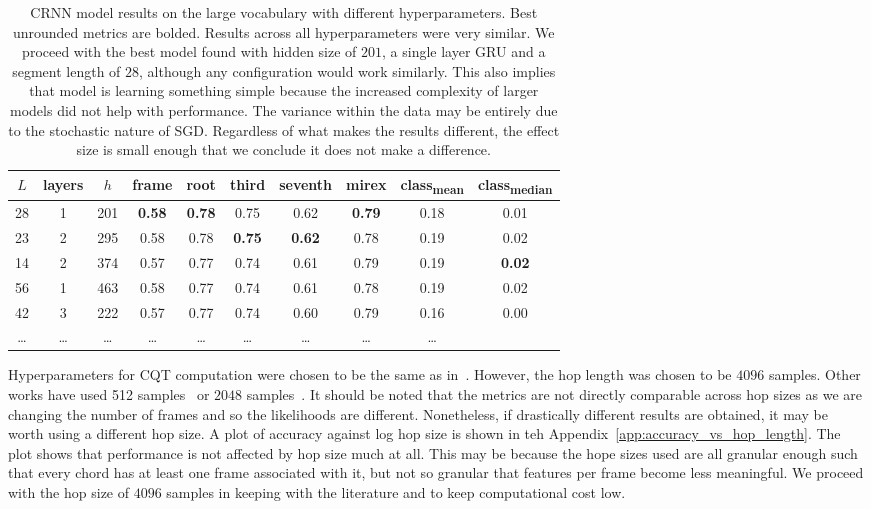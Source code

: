 \begin{table}[H]
    \centering
    \begin{tabular}{cccccccccc}
        \toprule
        $L$ & layers & $h$ & frame & root & third & seventh & mirex & class\textsubscript{mean} & class\textsubscript{median} \\
        \midrule
        28 & 1 & 201 & \textbf{0.58} & \textbf{0.78} & 0.75 & 0.62 & \textbf{0.79} & 0.18 & 0.01 \\
        23 & 2 & 295 & 0.58 & 0.78 & \textbf{0.75} & \textbf{0.62} & 0.78 & 0.19 & 0.02 \\
        14 & 2 & 374 & 0.57 & 0.77 & 0.74 & 0.61 & 0.79 & 0.19 & \textbf{0.02} \\
        56 & 1 & 463 & 0.58 & 0.77 & 0.74 & 0.61 & 0.78 & 0.19 & 0.02 \\
        42 & 3 & 222 & 0.57 & 0.77 & 0.74 & 0.60 & 0.79 & 0.16 & 0.00 \\
        \ldots & \ldots & \ldots & \ldots & \ldots & \ldots & \ldots & \ldots & \ldots \\
        \bottomrule
    \end{tabular}
    \caption{CRNN model results on the large vocabulary with different hyperparameters. Best unrounded metrics are bolded. Results across all hyperparameters were very similar. We proceed with the best model found with hidden size of $201$, a single layer GRU and a segment length of $28$, although any configuration would work similarly. This also implies that model is learning something simple because the increased complexity of larger models did not help with performance. The variance within the data may be entirely due to the stochastic nature of SGD. Regardless of what makes the results different, the effect size is small enough that we conclude it does not make a difference.}\label{tab:crnn_hparams}
\end{table}

Hyperparameters for CQT computation were chosen to be the same as in~\citet{StructuredTraining}. However, the hop length was chosen to be $4096$ samples. Other works have used 512 samples~\citet{ACRLargeVocab1} or $2048$ samples~\citet{CurriculumLearning}. It should be noted that the metrics are not directly comparable across hop sizes as we are changing the number of frames and so the likelihoods are different. Nonetheless, if drastically different results are obtained, it may be worth using a different hop size. A plot of accuracy against log hop size is shown in teh Appendix~\ref{app:accuracy_vs_hop_length}. The plot shows that performance is not affected by hop size much at all. This may be because the hope sizes used are all granular enough such that every chord has at least one frame associated with it, but not so granular that features per frame become less meaningful. We proceed with the hop size of $4096$ samples in keeping with the literature and to keep computational cost low.


